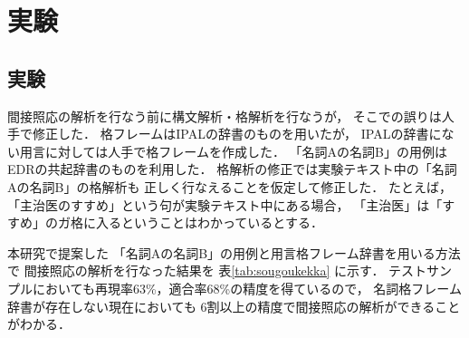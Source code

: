 \section{実験}
\subsection{実験}

間接照応の解析を行なう前に構文解析・格解析を行なうが，
そこでの誤りは人手で修正した．
格フレームはIPALの辞書のものを用いたが，
IPALの辞書にない用言に対しては人手で格フレームを作成した．
「名詞Aの名詞B」の用例は
EDRの共起辞書\cite{edr_kyouki_1.0}のものを利用した．
格解析の修正では実験テキスト中の「名詞Aの名詞B」の格解析も
正しく行なえることを仮定して修正した．
たとえば，「主治医のすすめ」という句が実験テキスト中にある場合，
「主治医」は「すすめ」のガ格に入るということはわかっているとする．

本研究で提案した
「名詞Aの名詞B」の用例と用言格フレーム辞書を用いる方法で
間接照応の解析を行なった結果を
表\ref{tab:sougoukekka} に示す．
テストサンプルにおいても再現率63\%，適合率68\%の精度を得ているので，
名詞格フレーム辞書が存在しない現在においても
6割以上の精度で間接照応の解析ができることがわかる．


